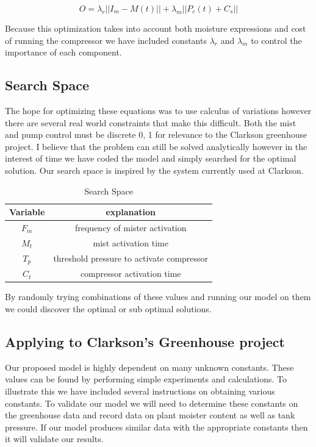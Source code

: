 \documentclass[a4paper,12pt]{article}
\begin{document}
\begin{equation}
		  O = \lambda_r || I_m - M(t) || + \lambda_m || P_c(t) + C_s||
\end{equation}

Because this optimization takes into account both moisture expressions and cost of running the compressor we have included constants $\lambda_r$ and $\lambda_m$ to control the importance of each component.


\subsection{Search Space}

The hope for optimizing these equations was to use calculus of variations however there are several real world constraints that make this difficult. Both the mist and pump control must be discrete 0, 1 for relevance to the Clarkson greenhouse project. I believe that the problem can still be solved analytically however in the interest of time we have coded the model and simply searched for the optimal solution. Our search space is inspired by the system currently used at Clarkson. 

\begin{table}[ht]
\caption{Search Space}
\centering
\begin{tabular} {c c}
\hline\hline
 Variable & explanation \\ [0.5ex]
\hline
$F_m$ & frequency of mister activation \\
$M_t$ & mist activation time \\
$T_p$ & threshold pressure to activate compressor \\ 
$C_t$ & compressor activation time \\ 
\hline
\end{tabular}
\end{table}

By randomly trying combinations of these values and running our model on them we could discover the optimal or sub optimal solutions.

\subsection{Applying to Clarkson's Greenhouse project}

Our proposed model is highly dependent on many unknown constants. These values can be found by performing simple experiments and calculations. To illustrate this we have included several instructions on obtaining various constants. To validate our model we will need to determine these constants on the greenhouse data and record data on plant moister content as well as tank pressure. If our model produces similar data with the appropriate constants then it will validate our results.
\end{document}
